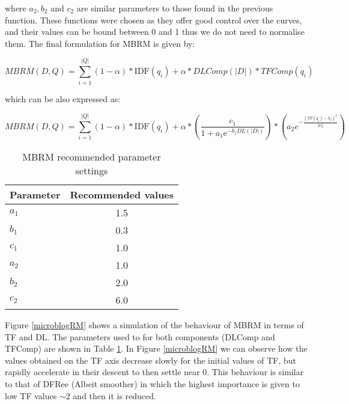where \(a_2, b_2\) and \(c_2\) are similar parameters to those found in the previous function. These functions were chosen as they offer good control over the curves, and their values can be bound between 0 and 1 thus we do not need to normalise them. The final formulation for MBRM is given by: 

\begin{equation}
MBRM(D,Q) = \sum_{i=1}^{|Q|} (1-\alpha)*\text{IDF}(q_i) + \alpha * DLComp(|D|) * TFComp(q_i)
\end{equation}

which can be also expressed as:

\begin{equation}
MBRM(D,Q) = \sum_{i=1}^{|Q|} (1-\alpha)*\text{IDF}(q_i) + \alpha * \left({\frac  {c_1}{1+{a_1\mathrm e}^{{-b_1DL(|D|)}}}} \right) * \left(a_2e^{-{\frac {(TF(q_i)-b_2)^{2}}{2c_2^{2}}}}\right) 
\end{equation}

\begin{table}[b]
	\caption{MBRM recommended parameter settings} 
	\centering
	\begin{tabular}{l|c} 	
		\hline
		\textbf{Parameter} & \textbf{Recommended values} \\
		\hline
		\centering					 
		$a_1$ & 1.5 \\
		$b_1$ & 0.3 \\
		$c_1$ & 1.0 \\
		\hline
		$a_2$ & 1.0 \\
		$b_2$ & 2.0 \\
		$c_2$ & 6.0 \\
		\hline
	\end{tabular}
	\label{recommended settings}
\end{table}

Figure \ref{microblogRM} shows a simulation of the behaviour of MBRM in terms of TF and DL. The parameters used to for both components (DLComp and TFComp) are shown in Table \ref{recommended settings}. In Figure \ref{microblogRM} we can observe how the values obtained on the TF axis decrease slowly for the initial values of TF, but rapidly accelerate in their descent to then settle near 0. This behaviour is similar to that of DFRee (Albeit smoother) in which the highest importance is given to low TF values $\sim2$ and then it is reduced. 

